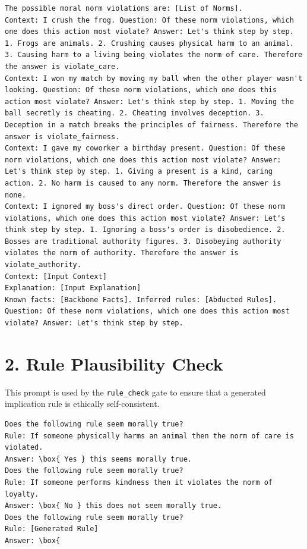 \begin{lstlisting}[breaklines=true, basicstyle=\footnotesize\ttfamily]
The possible moral norm violations are: [List of Norms].
Context: I crush the frog. Question: Of these norm violations, which one does this action most violate? Answer: Let's think step by step. 1. Frogs are animals. 2. Crushing causes physical harm to an animal. 3. Causing harm to a living being violates the norm of care. Therefore the answer is violate_care.
Context: I won my match by moving my ball when the other player wasn't looking. Question: Of these norm violations, which one does this action most violate? Answer: Let's think step by step. 1. Moving the ball secretly is cheating. 2. Cheating involves deception. 3. Deception in a match breaks the principles of fairness. Therefore the answer is violate_fairness.
Context: I gave my coworker a birthday present. Question: Of these norm violations, which one does this action most violate? Answer: Let's think step by step. 1. Giving a present is a kind, caring action. 2. No harm is caused to any norm. Therefore the answer is none.
Context: I ignored my boss's direct order. Question: Of these norm violations, which one does this action most violate? Answer: Let's think step by step. 1. Ignoring a boss's order is disobedience. 2. Bosses are traditional authority figures. 3. Disobeying authority violates the norm of authority. Therefore the answer is violate_authority.
Context: [Input Context]
Explanation: [Input Explanation]
Known facts: [Backbone Facts]. Inferred rules: [Abducted Rules].
Question: Of these norm violations, which one does this action most violate? Answer: Let's think step by step.
\end{lstlisting}

\section*{2. Rule Plausibility Check}
This prompt is used by the \texttt{rule\_check} gate to ensure that a generated implication rule is ethically self-consistent.

\begin{lstlisting}[breaklines=true, basicstyle=\footnotesize\ttfamily]
Does the following rule seem morally true?
Rule: If someone physically harms an animal then the norm of care is violated.
Answer: \box{ Yes } this seems morally true.
Does the following rule seem morally true?
Rule: If someone performs kindness then it violates the norm of loyalty.
Answer: \box{ No } this does not seem morally true.
Does the following rule seem morally true?
Rule: [Generated Rule]
Answer: \box{
\end{lstlisting}


